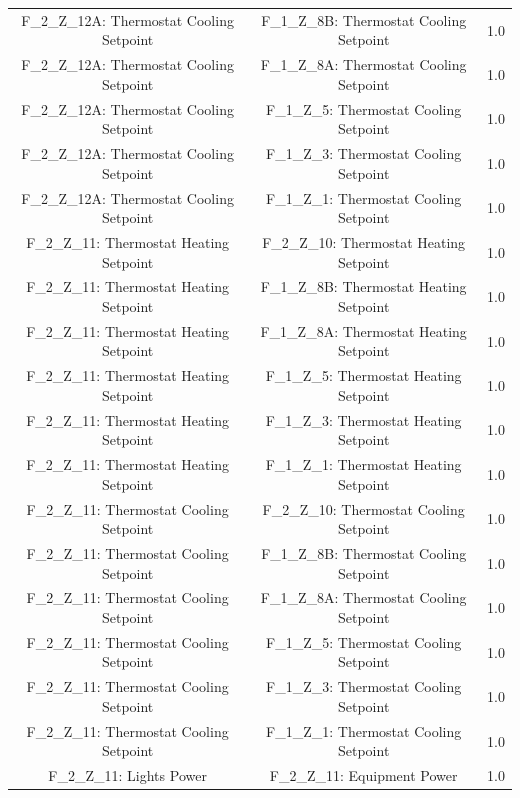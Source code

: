 \documentclass[aps, 10pt, a4paper]{article}
\begin{document}
\begin{longtable}{c|c||c}
                    F\_2\_Z\_12A: Thermostat Cooling Setpoint & F\_1\_Z\_8B: Thermostat Cooling Setpoint & 1.0 \\
                    F\_2\_Z\_12A: Thermostat Cooling Setpoint & F\_1\_Z\_8A: Thermostat Cooling Setpoint & 1.0 \\
                    F\_2\_Z\_12A: Thermostat Cooling Setpoint & F\_1\_Z\_5: Thermostat Cooling Setpoint & 1.0 \\
                    F\_2\_Z\_12A: Thermostat Cooling Setpoint & F\_1\_Z\_3: Thermostat Cooling Setpoint & 1.0 \\
                    F\_2\_Z\_12A: Thermostat Cooling Setpoint & F\_1\_Z\_1: Thermostat Cooling Setpoint & 1.0 \\
                    F\_2\_Z\_11: Thermostat Heating Setpoint & F\_2\_Z\_10: Thermostat Heating Setpoint & 1.0 \\
                    F\_2\_Z\_11: Thermostat Heating Setpoint & F\_1\_Z\_8B: Thermostat Heating Setpoint & 1.0 \\
                    F\_2\_Z\_11: Thermostat Heating Setpoint & F\_1\_Z\_8A: Thermostat Heating Setpoint & 1.0 \\
                    F\_2\_Z\_11: Thermostat Heating Setpoint & F\_1\_Z\_5: Thermostat Heating Setpoint & 1.0 \\
                    F\_2\_Z\_11: Thermostat Heating Setpoint & F\_1\_Z\_3: Thermostat Heating Setpoint & 1.0 \\
                    F\_2\_Z\_11: Thermostat Heating Setpoint & F\_1\_Z\_1: Thermostat Heating Setpoint & 1.0 \\
                    F\_2\_Z\_11: Thermostat Cooling Setpoint & F\_2\_Z\_10: Thermostat Cooling Setpoint & 1.0 \\
                    F\_2\_Z\_11: Thermostat Cooling Setpoint & F\_1\_Z\_8B: Thermostat Cooling Setpoint & 1.0 \\
                    F\_2\_Z\_11: Thermostat Cooling Setpoint & F\_1\_Z\_8A: Thermostat Cooling Setpoint & 1.0 \\
                    F\_2\_Z\_11: Thermostat Cooling Setpoint & F\_1\_Z\_5: Thermostat Cooling Setpoint & 1.0 \\
                    F\_2\_Z\_11: Thermostat Cooling Setpoint & F\_1\_Z\_3: Thermostat Cooling Setpoint & 1.0 \\
                    F\_2\_Z\_11: Thermostat Cooling Setpoint & F\_1\_Z\_1: Thermostat Cooling Setpoint & 1.0 \\
                    F\_2\_Z\_11: Lights Power & F\_2\_Z\_11: Equipment Power & 1.0 \\

\end{longtable}
\end{document}
